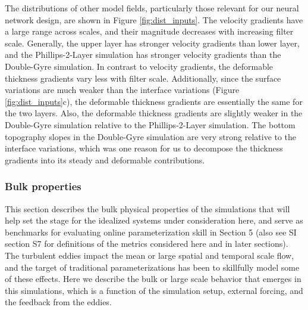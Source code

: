 \documentclass[draft]{agujournal2019}
\begin{document}
The distributions of other model fields, particularly those relevant for our neural network design, are shown in Figure \ref{fig:dist_inputs}. The velocity gradients have a large range across scales, and their magnitude decreases with increasing filter scale. Generally, the upper layer has stronger velocity gradients than lower layer, and the Phillips-2-Layer simulation has stronger velocity gradients than the Double-Gyre simulation. In contrast to velocity gradients, the deformable thickness gradients vary less with filter scale. Additionally, since the surface variations are much weaker than the interface variations (Figure \ref{fig:dist_inputs}c), the deformable thickness gradients are essentially the same for the two layers. Also, the deformable thickness gradients are slightly weaker in the Double-Gyre simulation relative to the Phillips-2-Layer simulation. The bottom topography slopes in the Double-Gyre simulation are very strong relative to the interface variations, which was one reason for us to decompose the thickness gradients into its steady and deformable contributions.


\subsubsection{Bulk properties}
This section describes the bulk physical properties of the simulations that will help set the stage for the idealized systems under consideration here, and serve as benchmarks for evaluating online parameterization skill in Section 5 (also see SI section S7 for definitions of the metrics considered here and in later sections). 
The turbulent eddies impact the mean or large spatial and temporal scale flow, and the target of traditional parameterizations has been to skillfully model some of these effects. Here we describe the bulk or large scale behavior that emerges in this simulations, which is a function of the simulation setup, external forcing, and the feedback from the eddies. 
\end{document}
